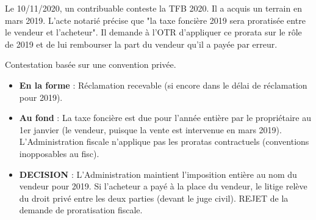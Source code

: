 \documentclass[a4paper, 11pt]{exam}
\begin{document}
\begin{questions}
		\question Le 10/11/2020, un contribuable conteste la TFB 2020. Il a acquis un terrain en mars 2019. L'acte notarié précise que "la taxe foncière 2019 sera proratisée entre le vendeur et l'acheteur". Il demande à l'OTR d'appliquer ce prorata sur le rôle de 2019 et de lui rembourser la part du vendeur qu'il a payée par erreur.
		\begin{solution}
			Contestation basée sur une convention privée.
			\begin{itemize}
				\item \textbf{En la forme} : Réclamation recevable (si encore dans le délai de réclamation pour 2019).
				\item \textbf{Au fond} : La taxe foncière est due pour l'année entière par le propriétaire au 1er janvier (le vendeur, puisque la vente est intervenue en mars 2019). L'Administration fiscale n'applique pas les proratas contractuels (conventions inopposables au fisc).
				\item \textbf{DECISION} : L'Administration maintient l'imposition entière au nom du vendeur pour 2019. Si l'acheteur a payé à la place du vendeur, le litige relève du droit privé entre les deux parties (devant le juge civil). REJET de la demande de proratisation fiscale.
			\end{itemize}
		\end{solution}
		
	\end{questions}
	
\end{document}
